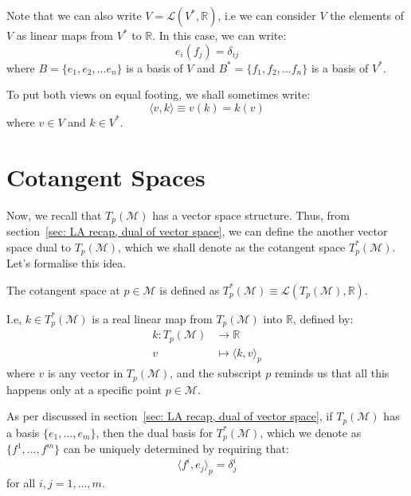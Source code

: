     Note that we can also write $V = \mathcal{L}(V^*, \mathbb{R})$, i.e we
    can consider $V$ the elements of $V$ as linear maps from $V^*$ to
    $\mathbb{R}$. In this case, we can write: \[e_i(f_j) = \delta_{ij}\]
    where $B = \{e_1, e_2, ... e_n\}$ is a basis of $V$ and $B^* = \{f_1,
    f_2, ... f_n\}$ is a basis of $V^*$. 

    To put both views on equal footing, we shall sometimes write: \[\langle
    v, k \rangle \equiv v(k) = k(v)\] where $v \in V$ and $k \in V^*$.
  \section{Cotangent Spaces}
    \label{sec: Cotangent Spaces}
    Now, we recall that $T_p(\mathcal{M})$ has a vector space structure.
    Thus, from section~\ref{sec: LA recap, dual of vector space}, we can
    define the another vector space dual to $T_p(\mathcal{M})$, which we
    shall denote as the cotangent space $T^*_p(\mathcal{M})$. Let's formalise this idea.
    \begin{definition}
      The cotangent space at $p \in \mathcal{M}$ is defined as
      $T^*_p(\mathcal{M}) \equiv \mathcal{L}(T_p(\mathcal{M}), \mathbb{R})$.
    \end{definition}
    \begin{remark}
      I.e, $k \in T_p^*(\mathcal{M})$ is a real linear map from
      $T_p(\mathcal{M})$ into $\mathbb{R}$, defined by:
      \begin{align*}
        k: T_p(\mathcal{M}) &\rightarrow \mathbb{R} \\
        v &\mapsto \langle k, v \rangle_p
      \end{align*}
      where $v$ is any vector in $T_p(\mathcal{M})$, and the subscript $p$
      reminds us that all this happens only at a specific point $p \in
      \mathcal{M}$. 
    \end{remark}
    As per discussed in section~\ref{sec: LA recap, dual of vector space}, if
    $T_p(\mathcal{M})$ has a basis $\{e_1,...,e_m\}$, then the dual basis for
    $T^*_p(\mathcal{M})$, which we denote as $\{f^1,...,f^m\}$ can be
    uniquely determined by requiring that:
    \begin{equation}
      \label{eqn: dual basis defn}
      \langle f^i, e_j \rangle_p = \delta^i_j
    \end{equation}
    for all $i,j = 1,...,m$.
